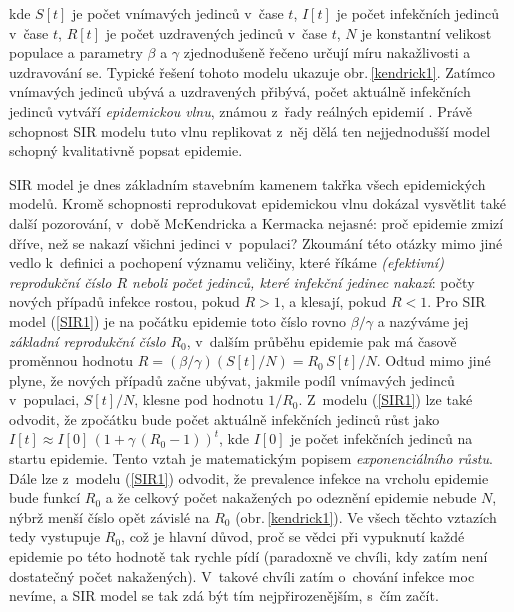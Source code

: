 kde $S[t]$ je počet vnímavých jedinců v~čase $t$, $I[t]$ je počet infekčních jedinců v~čase $t$, $R[t]$ je počet uzdravených jedinců v~čase $t$, $N$ je konstantní velikost populace a parametry $\beta$ a $\gamma$ zjednodušeně řečeno určují míru nakažlivosti a uzdravování se. Typické řešení tohoto modelu ukazuje obr.\,\ref{kendrick1}. Zatímco vnímavých jedinců ubývá a uzdravených přibývá, počet aktuálně infekčních jedinců vytváří \emph{epidemickou vlnu}, známou z~řady reálných epidemií \cite{Bell_etal2016,Finger_etal2019}. Právě schopnost SIR modelu tuto vlnu replikovat z~něj dělá ten nejjednodušší model schopný kvalitativně popsat epidemie.  

SIR model je dnes základním stavebním kamenem takřka všech epidemických modelů. Kromě schopnosti reprodukovat epidemickou vlnu dokázal vysvětlit také další pozorování, v~době McKendricka a Kermacka nejasné: proč epidemie zmizí dříve, než se nakazí všichni jedinci v~populaci? Zkoumání této otázky mimo jiné vedlo k~definici a pochopení významu veličiny, které říkáme \emph{(efektivní) reprodukční číslo $R$ neboli počet jedinců, které infekční jedinec nakazí}: počty nových případů infekce rostou, pokud $R>1$, a klesají, pokud $R<1$. Pro SIR model (\ref{SIR1}) je na počátku epidemie toto číslo rovno $\beta/\gamma$ a nazýváme jej \emph{základní reprodukční číslo} $R_0$, v~dalším průběhu epidemie pak má časově proměnnou hodnotu $R = (\beta/\gamma)(S[t]/N) = R_0 \,S[t] / N$. Odtud mimo jiné plyne, že nových případů začne ubývat, jakmile podíl vnímavých jedinců v~populaci, $S[t]/N$, klesne pod hodnotu $1/R_0$. Z~modelu (\ref{SIR1}) lze také odvodit, že zpočátku bude počet aktuálně infekčních jedinců růst jako $I[t] \approx I[0]\,(1+\gamma\,(R_0-1))^t$, kde $I[0]$ je počet infekčních jedinců na startu epidemie. Tento vztah je matematickým popisem \emph{exponenciálního růstu}. Dále lze z~modelu (\ref{SIR1}) odvodit, že prevalence infekce na vrcholu epidemie bude funkcí $R_0$ a že celkový počet nakažených po odeznění epidemie nebude $N$, nýbrž menší číslo opět závislé na $R_0$ (obr.\,\ref{kendrick1}). Ve všech těchto vztazích tedy vystupuje $R_0$, což je hlavní důvod, proč se vědci při vypuknutí každé epidemie po této hodnotě tak rychle pídí (paradoxně ve chvíli, kdy zatím není dostatečný počet nakažených). V~takové chvíli zatím o~chování infekce moc nevíme, a SIR model se tak zdá být tím nejpřirozenějším, s~čím začít. 

